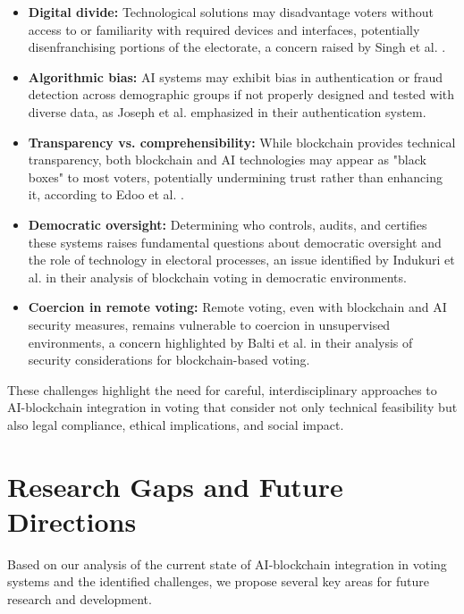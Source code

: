 \documentclass[conference]{IEEEtran}
\begin{document}
\begin{itemize}
    \item \textbf{Digital divide:} Technological solutions may disadvantage voters without access to or familiarity with required devices and interfaces, potentially disenfranchising portions of the electorate, a concern raised by Singh et al. \cite{b5}.
    
    \item \textbf{Algorithmic bias:} AI systems may exhibit bias in authentication or fraud detection across demographic groups if not properly designed and tested with diverse data, as Joseph et al. \cite{b6} emphasized in their authentication system.
    
    \item \textbf{Transparency vs. comprehensibility:} While blockchain provides technical transparency, both blockchain and AI technologies may appear as "black boxes" to most voters, potentially undermining trust rather than enhancing it, according to Edoo et al. \cite{b7}.
    
    \item \textbf{Democratic oversight:} Determining who controls, audits, and certifies these systems raises fundamental questions about democratic oversight and the role of technology in electoral processes, an issue identified by Indukuri et al. \cite{b8} in their analysis of blockchain voting in democratic environments.
    
    \item \textbf{Coercion in remote voting:} Remote voting, even with blockchain and AI security measures, remains vulnerable to coercion in unsupervised environments, a concern highlighted by Balti et al. \cite{b2} in their analysis of security considerations for blockchain-based voting.
\end{itemize}

These challenges highlight the need for careful, interdisciplinary approaches to AI-blockchain integration in voting that consider not only technical feasibility but also legal compliance, ethical implications, and social impact.

\section{Research Gaps and Future Directions}
Based on our analysis of the current state of AI-blockchain integration in voting systems and the identified challenges, we propose several key areas for future research and development.
\end{document}
